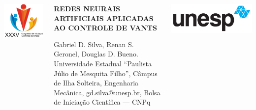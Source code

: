 \documentclass[serif,20pt]{beamer}
\begin{document}
\begin{frame}[t]
\vspace{5cm}
\begin{columns}
\includegraphics[width=\columnwidth]{cic_logo.png}
\begin{center}\Large{%
    \bfseries REDES NEURAIS ARTIFICIAIS APLICADAS AO CONTROLE DE VANTS}

    \small{Gabriel D. Silva, Renan S. Geronel, Douglas D. Bueno. Universidade Estadual ``Paulista Júlio de Mesquita Filho'', Câmpus de Ilha Solteira, Engenharia Mecânica, gd.silva@unesp.br, Bolsa de Iniciação Científica --- CNPq}
\end{center}
\includegraphics[width=\columnwidth]{unesp_logo.png}
\end{columns}

\vspace{5cm}


\end{frame}
\end{document}
